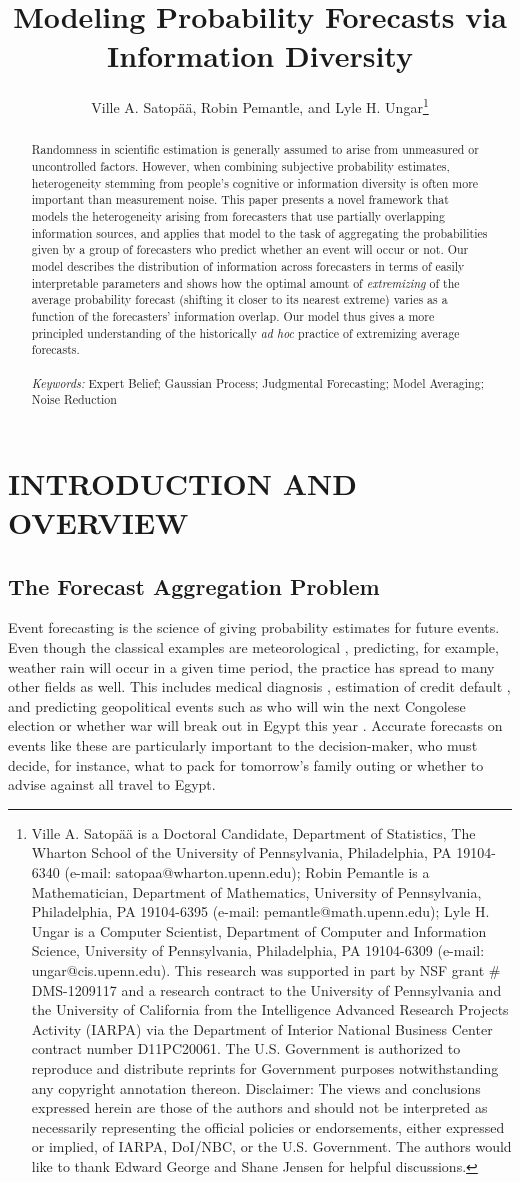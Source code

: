 \documentclass[12pt]{article}
\title{\vspace{-0em} \Large Modeling Probability Forecasts via Information Diversity}
\author{\vspace{-1em}Ville A. Satop\"a\"a, Robin Pemantle, and Lyle H. Ungar\thanks{Ville A. Satop\"a\"a is a Doctoral Candidate, Department of Statistics, The Wharton School of the University of Pennsylvania, Philadelphia, PA 19104-6340 (e-mail: satopaa@wharton.upenn.edu); Robin Pemantle is a Mathematician, Department of Mathematics, University of Pennsylvania, Philadelphia, PA 19104-6395 (e-mail: pemantle@math.upenn.edu); Lyle H. Ungar is a Computer Scientist, Department of Computer and Information Science, University of Pennsylvania, Philadelphia, PA 19104-6309 (e-mail: ungar@cis.upenn.edu). This research was supported in part by NSF grant \# DMS-1209117 and a research contract to the University
of Pennsylvania and the University of California from the Intelligence
Advanced Research Projects Activity (IARPA) via the Department of
Interior National Business Center contract number D11PC20061. The
U.S. Government is authorized to reproduce and distribute reprints for
Government purposes notwithstanding any copyright annotation
thereon. Disclaimer: The views and conclusions expressed herein are
those of the authors and should not be interpreted as necessarily
representing the official policies or endorsements, either expressed
or implied, of IARPA, DoI/NBC, or the U.S. Government.
The authors would like to thank Edward George and Shane Jensen for helpful discussions.}}
\date{\vspace{-8.5ex}}
\theoremstyle{definition}
\theoremstyle{definition}
\begin{document}
\maketitle
\begin{abstract}
\singlespace
Randomness in scientific estimation is generally 
assumed to arise from unmeasured or uncontrolled factors. However, 
when combining subjective probability estimates, heterogeneity
stemming from people's cognitive or information diversity is often
more important than measurement noise.  This paper presents a novel
framework that models the heterogeneity arising from forecasters that use 
partially overlapping information sources, and applies that model to 
the task of aggregating the probabilities given by a group of forecasters 
who predict whether an event will occur or not. Our model describes 
the distribution of information across forecasters in terms of easily
interpretable parameters and shows how the optimal amount
of \textit{extremizing} of the average probability forecast (shifting
it closer to its nearest extreme) varies as a function of the forecasters'
information overlap.  Our model thus gives a more principled
understanding of the historically {\it ad hoc} practice of extremizing
average forecasts.\\
\\
\textit{Keywords:} Expert Belief; Gaussian Process; Judgmental Forecasting; Model
Averaging; Noise Reduction
\end{abstract}




\newpage
\section{INTRODUCTION AND OVERVIEW}

\subsection{The Forecast Aggregation Problem}
Event forecasting is the science of giving probability estimates for future events.  Even though the classical examples are meteorological
\citep{murphy1977reliability}, predicting, for example, weather rain will occur in a given time period, the practice has 
spread to many other fields as well. This includes medical diagnosis  \citep{pepe2003statistical}, estimation of credit default
\citep{kramer2006evaluating}, and predicting geopolitical events such as who will win
the next Congolese election or whether war will break out in Egypt
this year \citep{tetlock2005expert}. Accurate forecasts on events like these are particularly important to the decision-maker, who must decide, for instance, what to pack
for tomorrow's family outing or whether to advise against all travel
to Egypt.
\end{document}
